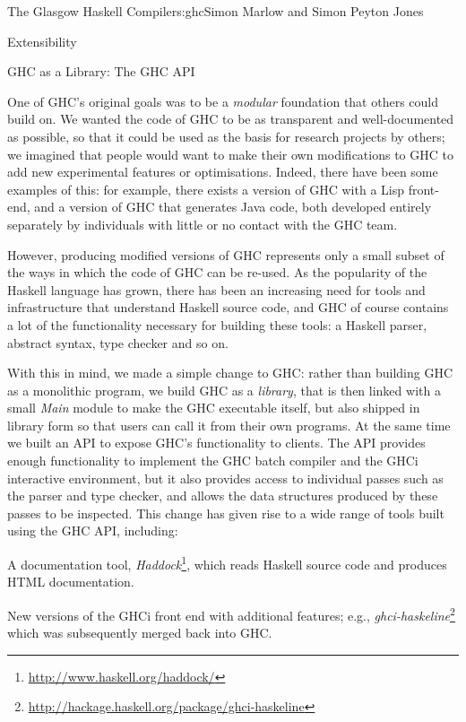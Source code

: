 \begin{aosachapter}{The Glasgow Haskell Compiler}{s:ghc}{Simon Marlow and Simon Peyton Jones}
\begin{aosasect1}{Extensibility}
\begin{aosasect2}{GHC as a Library: The GHC API}
\label{s:ghcapi}

One of GHC's original goals was to be a \emph{modular} foundation that
others could build on.  We wanted the code of GHC to be as transparent
and well-documented as possible, so that it could be used as the basis
for research projects by others; we imagined that people would want to
make their own modifications to GHC to add new experimental features
or optimisations.  Indeed, there have been some examples of this: for
example, there exists a version of GHC with a Lisp front-end, and a
version of GHC that generates Java code, both developed entirely
separately by individuals with little or no contact with the GHC team.

However, producing modified versions of GHC represents only a small
subset of the ways in which the code of GHC can be re-used.  As the
popularity of the Haskell language has grown, there has been an
increasing need for tools and infrastructure that understand Haskell
source code, and GHC of course contains a lot of the functionality
necessary for building these tools: a Haskell parser, abstract syntax,
type checker and so on.

With this in mind, we made a simple change to GHC: rather than
building GHC as a monolithic program, we build GHC as a
\emph{library}, that is then linked with a small \emph{Main} module to
make the GHC executable itself, but also shipped in library form so
that users can call it from their own programs.  At the same time we
built an API to expose GHC's functionality to clients.  The API
provides enough functionality to implement the GHC batch compiler and
the GHCi interactive environment, but it also provides access to
individual passes such as the parser and type checker, and allows the
data structures produced by these passes to be inspected.  This change
has given rise to a wide range of tools built using the GHC API,
including:

\begin{aosaitemize}

\item A documentation tool,
  \emph{Haddock}\footnote{\url{http://www.haskell.org/haddock/}},
  which reads Haskell source code and produces HTML documentation.

\item New versions of the GHCi front end with additional features;
  e.g., \emph{ghci-haskeline}\footnote{\url{http://hackage.haskell.org/package/ghci-haskeline}}
  which was subsequently merged back into GHC.


\end{aosaitemize}
\end{aosasect2}
\end{aosasect1}
\end{aosachapter}
